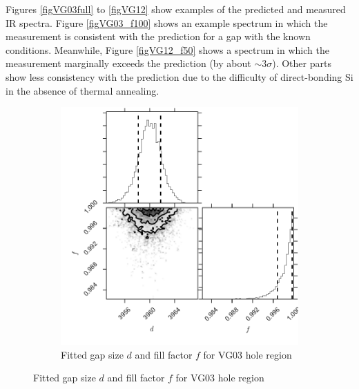 \documentclass[osajnl,preprint,showpacs,superscriptaddress,12pt]{revtex4-1} %
\begin{document}


Figures \ref{figVG03full} to \ref{figVG12} show examples of the predicted and measured IR spectra.  Figure \ref{figVG03_f100} shows an example spectrum in which the measurement is consistent with the prediction for a gap with the known conditions.  Meanwhile, Figure \ref{figVG12_f50} shows a spectrum in which the measurement marginally exceeds the prediction (by about $\sim 3 \sigma$).  Other parts show less consistency with the prediction due to the difficulty of direct-bonding Si in the absence of thermal annealing.  

\begin{figure}[htbp]
        \centering
        \begin{subfigure}[b]{0.5\textwidth}
              \includegraphics[width=\textwidth]{figs/VG03_corner.pdf}
              \caption{Fitted gap size $d$ and fill factor $f$ for VG03 hole region}
		\label{figVG03_corner}
        \end{subfigure}
	

\end{figure}
\end{document}
